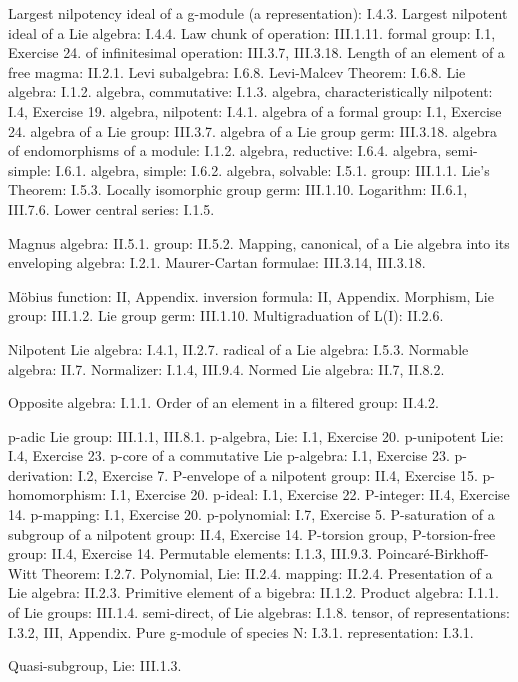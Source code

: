 Largest nilpotency ideal of a g-module (a representation): I.4.3. Largest nilpotent ideal of a Lie algebra: I.4.4. Law chunk of operation: III.1.11. formal group: I.1, Exercise 24. of infinitesimal operation: III.3.7, III.3.18. Length of an element of a free magma: II.2.1. Levi subalgebra: I.6.8. Levi-Malcev Theorem: I.6.8. Lie algebra: I.1.2. algebra, commutative: I.1.3. algebra, characteristically nilpotent: I.4, Exercise 19. algebra, nilpotent: I.4.1. algebra of a formal group: I.1, Exercise 24. algebra of a Lie group: III.3.7. algebra of a Lie group germ: III.3.18. algebra of endomorphisms of a module: I.1.2. algebra, reductive: I.6.4. algebra, semi-simple: I.6.1. algebra, simple: I.6.2. algebra, solvable: I.5.1. group: III.1.1. Lie's Theorem: I.5.3. Locally isomorphic group germ: III.1.10. Logarithm: II.6.1, III.7.6. Lower central series: I.1.5.

Magnus algebra: II.5.1. group: II.5.2. Mapping, canonical, of a Lie algebra into its enveloping algebra: I.2.1. Maurer-Cartan formulae: III.3.14, III.3.18.

Möbius function: II, Appendix. inversion formula: II, Appendix. Morphism, Lie group: III.1.2. Lie group germ: III.1.10. Multigraduation of L(I): II.2.6.

Nilpotent Lie algebra: I.4.1, II.2.7. radical of a Lie algebra: I.5.3. Normable algebra: II.7. Normalizer: I.1.4, III.9.4. Normed Lie algebra: II.7, II.8.2.

Opposite algebra: I.1.1. Order of an element in a filtered group: II.4.2.

p-adic Lie group: III.1.1, III.8.1. p-algebra, Lie: I.1, Exercise 20. p-unipotent Lie: I.4, Exercise 23. p-core of a commutative Lie p-algebra: I.1, Exercise 23. p-derivation: I.2, Exercise 7. P-envelope of a nilpotent group: II.4, Exercise 15. p-homomorphism: I.1, Exercise 20. p-ideal: I.1, Exercise 22. P-integer: II.4, Exercise 14. p-mapping: I.1, Exercise 20. p-polynomial: I.7, Exercise 5. P-saturation of a subgroup of a nilpotent group: II.4, Exercise 14. P-torsion group, P-torsion-free group: II.4, Exercise 14. Permutable elements: I.1.3, III.9.3. Poincaré-Birkhoff-Witt Theorem: I.2.7. Polynomial, Lie: II.2.4. mapping: II.2.4. Presentation of a Lie algebra: II.2.3. Primitive element of a bigebra: II.1.2. Product algebra: I.1.1. of Lie groups: III.1.4. semi-direct, of Lie algebras: I.1.8. tensor, of representations: I.3.2, III, Appendix. Pure g-module of species N: I.3.1. representation: I.3.1.

Quasi-subgroup, Lie: III.1.3.

